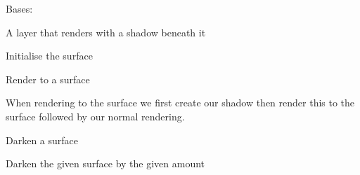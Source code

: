 \documentclass[letterpaper,10pt,english]{sphinxmanual}
\begin{document}
\begin{fulllineitems}
\label{blocks:serge.blocks.visualeffects.ShadowLayer}
Bases: {\hyperref[renderering:serge.render.Layer]{}}

A layer that renders with a shadow beneath it

\begin{fulllineitems}
\label{blocks:serge.blocks.visualeffects.ShadowLayer.initSurface}
Initialise the surface

\end{fulllineitems}


\begin{fulllineitems}
\label{blocks:serge.blocks.visualeffects.ShadowLayer.render}
Render to a surface

When rendering to the surface we first create our shadow then
render this to the surface followed by our normal rendering.

\end{fulllineitems}


\end{fulllineitems}


\begin{fulllineitems}
\label{blocks:serge.blocks.visualeffects.darkenSurf}
Darken a surface

\end{fulllineitems}


\begin{fulllineitems}
\label{blocks:serge.blocks.visualeffects.darkenSurf2}
Darken the given surface by the given amount

\end{fulllineitems}
\end{document}
